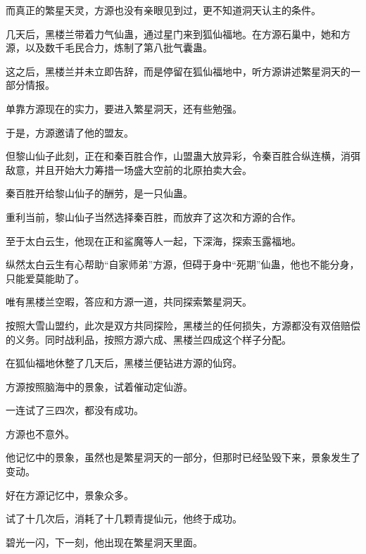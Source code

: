 \begin{this_body}
而真正的繁星天灵，方源也没有亲眼见到过，更不知道洞天认主的条件。

几天后，黑楼兰带着力气仙蛊，通过星门来到狐仙福地。在方源石巢中，她和方源，以及数千毛民合力，炼制了第八批气囊蛊。

这之后，黑楼兰并未立即告辞，而是停留在狐仙福地中，听方源讲述繁星洞天的一部分情报。

单靠方源现在的实力，要进入繁星洞天，还有些勉强。

于是，方源邀请了他的盟友。

但黎山仙子此刻，正在和秦百胜合作，山盟蛊大放异彩，令秦百胜合纵连横，消弭敌意，并且开始大力筹措一场盛大空前的北原拍卖大会。

秦百胜开给黎山仙子的酬劳，是一只仙蛊。

重利当前，黎山仙子当然选择秦百胜，而放弃了这次和方源的合作。

至于太白云生，他现在正和鲨魔等人一起，下深海，探索玉露福地。

纵然太白云生有心帮助“自家师弟”方源，但碍于身中“死期”仙蛊，他也不能分身，只能爱莫能助了。

唯有黑楼兰空暇，答应和方源一道，共同探索繁星洞天。

按照大雪山盟约，此次是双方共同探险，黑楼兰的任何损失，方源都没有双倍赔偿的义务。同时战利品，按照方源六成、黑楼兰四成这个样子分配。

在狐仙福地休整了几天后，黑楼兰便钻进方源的仙窍。

方源按照脑海中的景象，试着催动定仙游。

一连试了三四次，都没有成功。

方源也不意外。

他记忆中的景象，虽然也是繁星洞天的一部分，但那时已经坠毁下来，景象发生了变动。

好在方源记忆中，景象众多。

试了十几次后，消耗了十几颗青提仙元，他终于成功。

碧光一闪，下一刻，他出现在繁星洞天里面。

\end{this_body}

